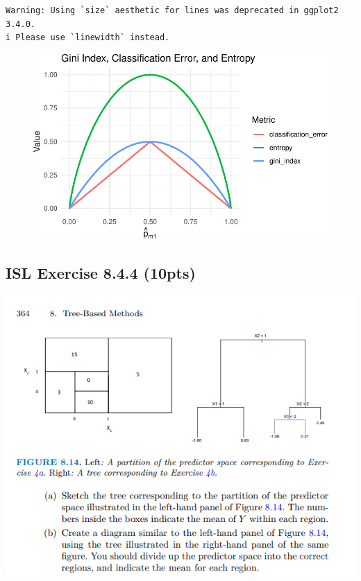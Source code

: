 \documentclass[
]{article}
\begin{document}
\begin{verbatim}
Warning: Using `size` aesthetic for lines was deprecated in ggplot2 3.4.0.
i Please use `linewidth` instead.
\end{verbatim}

\begin{figure}[H]

{\centering \includegraphics{hw4_files/figure-pdf/unnamed-chunk-2-1.pdf}

}

\end{figure}

\hypertarget{isl-exercise-8.4.4-10pts}{%
\subsection{ISL Exercise 8.4.4 (10pts)}\label{isl-exercise-8.4.4-10pts}}

\includegraphics{images/clipboard-3811150071.png}
\end{document}
